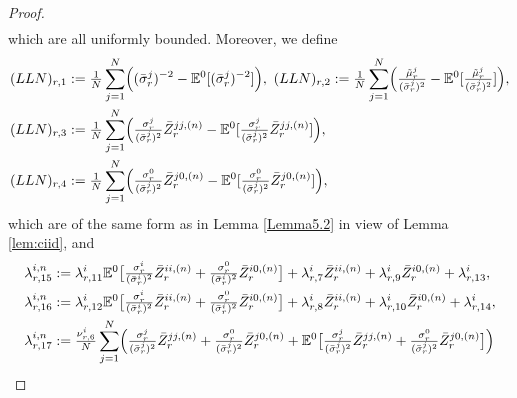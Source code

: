 \documentclass[10pt,a4paper]{amsart}
\begin{document}
\begin{proof}
\begin{align}
\end{align}
which are all uniformly bounded. Moreover, we define
\begin{align}
(LLN)_{r,1} &:= \tfrac{1}{N}\sum_{j=1}^{N}\Bigl((\bar{\sigma}_{r}^{j})^{-2}-\mathbb{E}^{0}[(\bar{\sigma}_{r}^{j})^{-2}]\Bigr), \ (LLN)_{r,2} := \tfrac{1}{N}\sum_{j=1}^{N}\Bigl(\tfrac{\tilde{\mu}_{r}^{j}}{(\bar{\sigma}_{r}^{j})^{2}}-\mathbb{E}^{0}[\tfrac{\tilde{\mu}_{r}^{j}}{(\bar{\sigma}_{r}^{j})^{2}}]\Bigr),  \label{equ:def_LLN1} \\
(LLN)_{r,3} &:= \tfrac{1}{N}\sum_{j=1}^{N}\Bigl(\tfrac{\sigma_{r}^{j}}{(\bar{\sigma}_{r}^{j})^{2}}\bar{Z}_{r}^{jj,(n)}-\mathbb{E}^{0}[\tfrac{\sigma_{r}^{j}}{(\bar{\sigma}_{r}^{j})^{2}}\bar{Z}_{r}^{jj,(n)}]\Bigr), 
\label{equ:def_LLN3} \\
(LLN)_{r,4} &:= \tfrac{1}{N}\sum_{j=1}^{N}\Bigl(\tfrac{\sigma_{r}^{0}}{(\bar{\sigma}_{r}^{j})^{2}}\bar{Z}_{r}^{j0,(n)}-\mathbb{E}^{0}[\tfrac{\sigma_{r}^{0}}{(\bar{\sigma}_{r}^{j})^{2}}\bar{Z}_{r}^{j0,(n)}]\Bigr), \label{equ:def_LLN4}
\end{align}
which are of the same form as in Lemma \ref{Lemma5.2} in view of Lemma \ref{lem:ciid}, and
\begin{align}
\lambda_{r,15}^{i,n} &:= \lambda_{r,11}^{i}\mathbb{E}^{0}\bigl[\tfrac{\sigma_{r}^{i}}{(\bar{\sigma}_{r}^{i})^{2}}\bar{Z}_{r}^{ii,(n)}+\tfrac{\sigma_{r}^{0}}{(\bar{\sigma}_{r}^{i})^{2}}\bar{Z}_{r}^{i0,(n)}\bigr] + \lambda_{r,7}^{i}\bar{Z}_{r}^{ii,(n)} + \lambda_{r,9}^{i}\bar{Z}_{r}^{i0,(n)} + \lambda_{r,13}^{i} \label{equ:def_lambda15}, \\
\lambda_{r,16}^{i,n} &:= \lambda_{r,12}^{i}\mathbb{E}^{0}\bigl[\tfrac{\sigma_{r}^{i}}{(\bar{\sigma}_{r}^{i})^{2}}\bar{Z}_{r}^{ii,(n)}+\tfrac{\sigma_{r}^{0}}{(\bar{\sigma}_{r}^{i})^{2}}\bar{Z}_{r}^{i0,(n)}\bigr] + \lambda_{r,8}^{i}\bar{Z}_{r}^{ii,(n)} + \lambda_{r,10}^{i}\bar{Z}_{r}^{i0,(n)} + \lambda_{r,14}^{i} \label{equ:def_lambda16}, \\
\lambda_{r,17}^{i,n} &:= \tfrac{\nu_{r,6}^{i}}{N}\sum_{j=1}^{N}\Bigl(\tfrac{\sigma_{r}^{j}}{(\bar{\sigma}_{r}^{j})^{2}}\bar{Z}_{r}^{jj,(n)} + \tfrac{\sigma_{r}^{0}}{(\bar{\sigma}_{r}^{j})^{2}}\bar{Z}_{r}^{j0,(n)} + \mathbb{E}^{0}\bigl[\tfrac{\sigma_{r}^{j}}{(\bar{\sigma}_{r}^{j})^{2}}\bar{Z}_{r}^{jj,(n)}+\tfrac{\sigma_{r}^{0}}{(\bar{\sigma}_{r}^{j})^{2}}\bar{Z}_{r}^{j0,(n)}\bigr]\Bigr) \\

\end{align}
\end{proof}
\end{document}
